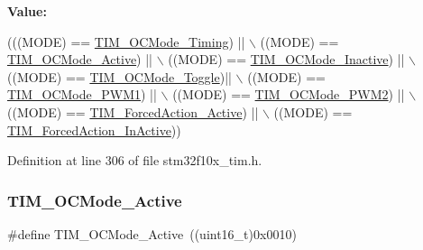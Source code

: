 {\bfseries Value\+:}
\begin{DoxyCode}
(((MODE) == \hyperlink{group___t_i_m___output___compare__and___p_w_m__modes_ga54d5745fade3b2f8ea1325e7447ca760}{TIM\_OCMode\_Timing}) || \(\backslash\)
                          ((MODE) == \hyperlink{group___t_i_m___output___compare__and___p_w_m__modes_ga76bac57d41dc67218772f9c745c77102}{TIM\_OCMode\_Active}) || \(\backslash\)
                          ((MODE) == \hyperlink{group___t_i_m___output___compare__and___p_w_m__modes_gae0c350d7adaea14a37cabc2ab762695f}{TIM\_OCMode\_Inactive}) || \(\backslash\)
                          ((MODE) == \hyperlink{group___t_i_m___output___compare__and___p_w_m__modes_ga8b8adb6e81fe88bd14d44430f7f97021}{TIM\_OCMode\_Toggle})|| \(\backslash\)
                          ((MODE) == \hyperlink{group___t_i_m___output___compare__and___p_w_m__modes_gaefbe32dddc9630fbcc48b302b50d15fc}{TIM\_OCMode\_PWM1}) || \(\backslash\)
                          ((MODE) == \hyperlink{group___t_i_m___output___compare__and___p_w_m__modes_ga722d8f33a795ef82ed7ae76dfbb7613d}{TIM\_OCMode\_PWM2}) || \(\backslash\)
                          ((MODE) == \hyperlink{group___t_i_m___forced___action_ga19d3769825f1dfdbdbde3edb60310b99}{TIM\_ForcedAction\_Active}) || \(\backslash\)
                          ((MODE) == \hyperlink{group___t_i_m___forced___action_ga79656f2193ec5e12a15d0ae5b025d273}{TIM\_ForcedAction\_InActive}))
\end{DoxyCode}


Definition at line 306 of file stm32f10x\+\_\+tim.\+h.

\mbox{\label{group___t_i_m___output___compare__and___p_w_m__modes_ga76bac57d41dc67218772f9c745c77102}} 
\subsubsection{\texorpdfstring{T\+I\+M\+\_\+\+O\+C\+Mode\+\_\+\+Active}{TIM\_OCMode\_Active}}
{\footnotesize\ttfamily \#define T\+I\+M\+\_\+\+O\+C\+Mode\+\_\+\+Active~((uint16\+\_\+t)0x0010)}



